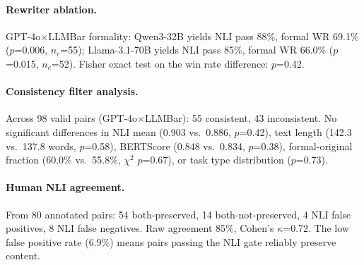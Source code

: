 \documentclass[11pt,a4paper]{article}
\begin{document}
\paragraph{Rewriter ablation.}
GPT-4o$\times$LLMBar formality: Qwen3-32B yields NLI pass 88\%, formal WR 69.1\% ($p$=0.006, $n_c$=55); Llama-3.1-70B yields NLI pass 85\%, formal WR 66.0\% ($p$=0.015, $n_c$=52). Fisher exact test on the win rate difference: $p$=0.42.

\paragraph{Consistency filter analysis.}
Across 98 valid pairs (GPT-4o$\times$LLMBar): 55 consistent, 43 inconsistent. No significant differences in NLI mean (0.903 vs.\ 0.886, $p$=0.42), text length (142.3 vs.\ 137.8 words, $p$=0.58), BERTScore (0.848 vs.\ 0.834, $p$=0.38), formal-original fraction (60.0\% vs.\ 55.8\%, $\chi^2$ $p$=0.67), or task type distribution ($p$=0.73).

\paragraph{Human NLI agreement.}
From 80 annotated pairs: 54 both-preserved, 14 both-not-preserved, 4 NLI false positives, 8 NLI false negatives. Raw agreement 85\%, Cohen's $\kappa$=0.72. The low false positive rate (6.9\%) means pairs passing the NLI gate reliably preserve content.
\end{document}
